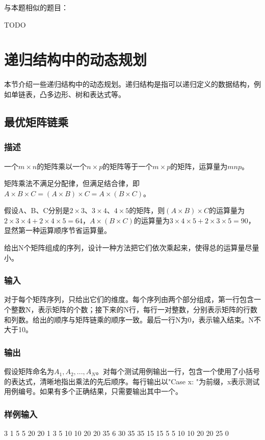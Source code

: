 与本题相似的题目：
\begindot
\item TODO
\myenddot


\section{递归结构中的动态规划} %
本节介绍一些递归结构中的动态规划。递归结构是指可以递归定义的数据结构，例如单链表，凸多边形、树和表达式等。


\subsection{最优矩阵链乘}
\subsubsection{描述}
一个$m \times n$的矩阵乘以一个$n \times p$的矩阵等于一个$m \times p$的矩阵，运算量为$mnp$。

矩阵乘法不满足分配律，但满足结合律，即$A \times B \times C=(A \times B) \times C=A \times (B \times C)$。

假设A、B、C分别是$2 \times 3$、$3 \times 4$、$4 \times 5$的矩阵，则$(A \times B) \times C$的运算量为$2 \times 3 \times 4 + 2 \times 4 \times 5=64$，$A \times (B \times C)$的运算量为$3 \times 4 \times 5 + 2 \times 3 \times 5=90$，显然第一种运算顺序节省运算量。

给出N个矩阵组成的序列，设计一种方法把它们依次乘起来，使得总的运算量尽量小。

\subsubsection{输入}
对于每个矩阵序列，只给出它们的维度。每个序列由两个部分组成，第一行包含一个整数N，表示矩阵的个数；接下来的N行，每行一对整数，分别表示矩阵的行数和列数。给出的顺序与矩阵链乘的顺序一致。最后一行N为0，表示输入结束。N不大于10。

\subsubsection{输出}
假设矩阵命名为$A_1,A_2,...,A_N$。对每个测试用例输出一行，包含一个使用了小括号的表达式，清晰地指出乘法的先后顺序。每行输出以"Case x: "为前缀，x表示测试用例编号。如果有多个正确结果，只需要输出其中一个。

\subsubsection{样例输入}
\begin{Code}
3
1 5
5 20
20 1
3
5 10
10 20
20 35
6
30 35
35 15
15 5
5 10
10 20
20 25
0
\end{Code}

